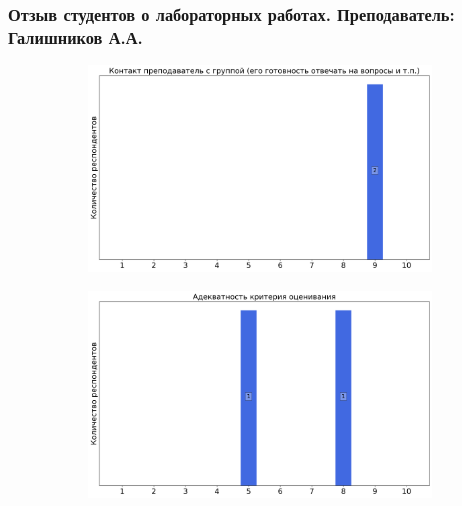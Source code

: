 	\subsubsection{Отзыв студентов о лабораторных работах. Преподаватель: Галишников А.А.}
		\begin{figure}[H]
			\centering
			\begin{subfigure}[b]{0.45\textwidth}
				\centering
				\includegraphics[width=\textwidth]{images/2 course/Общая физика - электричество и магнетизм/labniks-marks-Галишников А.А.-0.png}
			\end{subfigure}
			\begin{subfigure}[b]{0.45\textwidth}
				\centering
				\includegraphics[width=\textwidth]{images/2 course/Общая физика - электричество и магнетизм/labniks-marks-Галишников А.А.-1.png}
			\end{subfigure}
			\begin{subfigure}[b]{0.45\textwidth}
				\centering

\end{subfigure}
\end{figure}
